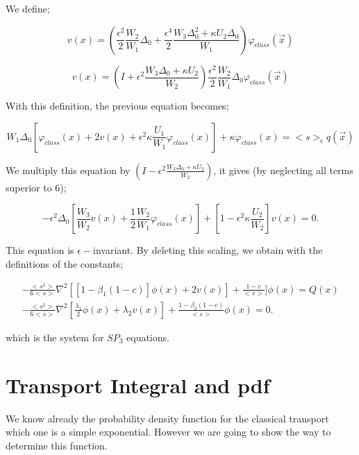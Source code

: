 \documentclass[a4paper, 12pt]{report}
\newcommand{\bl}{\big<}
\newcommand{\bg}{\big>}
\begin{document}
\begin{appendix}
We define;

\begin{equation}
v(x) = \left( \frac{\epsilon^2}{2} \frac{W_2}{W_1} \Delta_0 + \frac{\epsilon^4}{2} \frac{W_3 \Delta_0^2 + \kappa U_2 \Delta_0}{W_1} \right)\varphi_{class}(\vec{x})
\end{equation}

\begin{equation}
v(x) = \left( I + \epsilon^2 \frac{W_3 \Delta_0 + \kappa U_2 }{W_2} \right) \frac{\epsilon^2}{2}\frac{W_2}{W_1}\Delta_0\varphi_{class}(\vec{x})
\end{equation}

With this definition, the previous equation becomes;

\begin{equation}
W_1 \Delta_0 \left[\varphi_{class}(x) + 2v(x) + \epsilon^2\kappa\frac{U_1}{W_1}\varphi_{class}(x) \right] + \kappa \varphi_{class}(x) = \bl s \bg_\epsilon q(\vec{x})
\end{equation}


We multiply this equation by $(I - \epsilon^2 \frac{W_3 \Delta_0 + \kappa U_2 }{W_2})$, it gives (by neglecting all terms superior to 6);

\begin{equation}
-\epsilon^2 \Delta_0 \left[\frac{W_3}{W_2}v(x) + \frac{1}{2}\frac{W_2}{W_1}\varphi_{class}(x) \right]  + \left[1-\epsilon^2\kappa\frac{U_2}{W_2} \right] v(x) = 0.
\end{equation}

This equation is $\epsilon-$invariant. By deleting this scaling, we obtain with the definitions of the constants;

\begin{align}
-\frac{\bl s^2\bg}{6\bl s\bg} \nabla^2 \left[ \left[1-\beta_1(1-c)\right] \phi(x) + 2 v(x) \right] + \frac{1-c}{\bl s\bg}] \phi(x) = Q(x) \\
-\frac{\bl s^2\bg}{6\bl s\bg} \nabla^2 \left[ \frac{\lambda_1}{2} \phi(x) + \lambda_2 v(x) \right] + \frac{1-\beta_2(1-c)}{\bl s\bg} \phi(x) = 0.
\end{align}

which is the system for $SP_3$ equations.

\chapter{Transport Integral and pdf}\label{class}
We know already the probability density function for the classical transport which one is a simple exponential. However we are going to show the way to determine this function.


\end{appendix}
\end{document}
